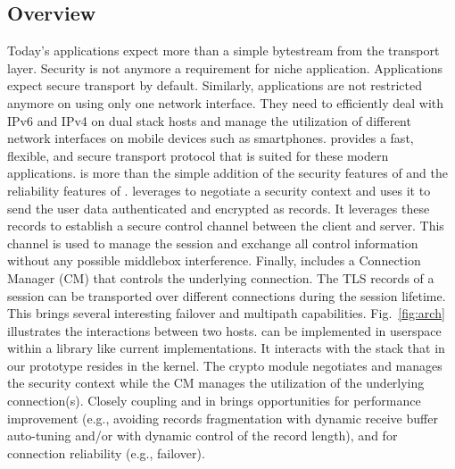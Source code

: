 




\subsection{Overview}
Today's applications expect more than a simple bytestream from the transport
layer. Security is not anymore a requirement for niche application. Applications
expect secure transport by default. Similarly, applications are not restricted
anymore on using only one network interface. They need to efficiently deal with
IPv6 and IPv4 on dual stack hosts and manage the utilization of different
network interfaces on mobile devices such as smartphones. \tcpls provides a
fast, flexible, and secure transport protocol that is suited for these modern
applications. \tcpls is more than the simple addition of the security features
of \tls and the reliability features of \tcp. \tcpls leverages  to
negotiate a security context and uses it to send the user data authenticated and
encrypted as \tls records. It leverages these records to establish a secure
control channel between the client and server. This channel is used to manage
the \tcpls session and exchange all control information without any possible
middlebox interference. Finally, \tcpls includes a Connection Manager (CM) that
controls the underlying \tcp connection. The TLS records of a \tcpls session can
be transported over different \tcp connections during the session lifetime. This
brings several interesting failover and multipath capabilities.
Fig.~\ref{fig:arch} illustrates the interactions between two \tcpls hosts.
\tcpls can be implemented in userspace within a library like current \tls
implementations. It interacts with the \tcp stack that in our prototype resides
in the kernel. The crypto module negotiates and manages the security context
while the CM manages the utilization of the underlying \tcp connection(s). Closely coupling \tcp and \tls in \tcpls brings opportunities for performance improvement (e.g., avoiding records fragmentation with dynamic receive buffer auto-tuning and/or with dynamic control of the record length), and for connection reliability (e.g., failover).


